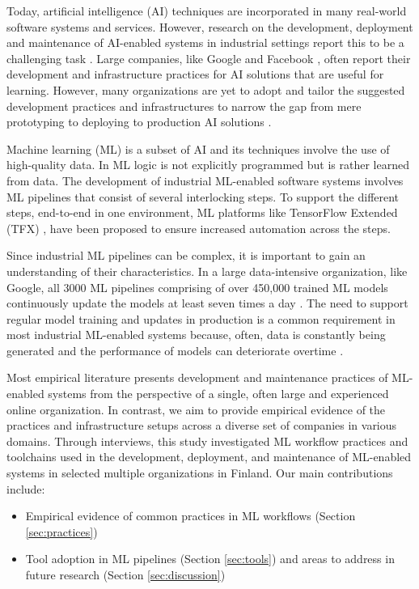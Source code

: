 Today, artificial intelligence (AI) techniques are incorporated in many real-world software systems and services. However, research on the development, deployment and maintenance of AI-enabled systems in industrial settings report this to be a challenging task \cite{Sculley2015, Lwakatare2019}. Large companies, like Google \cite{Baylor2017} and Facebook \cite{Hazelwood2018Facebook}, often report their development and infrastructure practices for AI solutions that are useful for learning. However, many organizations are yet to adopt and tailor the suggested development practices and infrastructures to narrow the gap from mere prototyping to deploying to production AI solutions \cite{Serban2020Practices}. 

Machine learning (ML) is a subset of AI and its techniques involve the use of high-quality data. In ML logic is not explicitly programmed but is rather learned from data. The development of industrial ML-enabled software systems involves ML pipelines that consist of several interlocking steps. To support the different steps, end-to-end in one environment, ML platforms like TensorFlow Extended (TFX) \cite{Baylor2017}, have been proposed to ensure increased automation across the steps.

Since industrial ML pipelines can be complex, it is important to gain an understanding of their characteristics. In a large data-intensive organization, like Google, all 3000 ML pipelines comprising of over 450,000 trained ML models continuously update the models at least seven times a day \cite{Doris2021MLPipelines}. %
The need to support regular model training and updates in production is a common requirement in most industrial ML-enabled systems because, often, data is constantly being generated and the performance of models can deteriorate overtime \cite{Sculley2015}.

Most empirical literature presents development and maintenance practices of ML-enabled systems from the perspective of a single, often large and experienced online organization. In contrast, we aim to provide empirical evidence of the practices and infrastructure setups across a diverse set of companies in various domains. Through interviews, this study investigated ML workflow practices and toolchains used in the development, deployment, and maintenance of ML-enabled systems in selected multiple organizations in Finland. Our main contributions include:
\begin{itemize}
    \item Empirical evidence of common practices in ML workflows (Section \ref{sec:practices})
    \item Tool adoption in ML pipelines (Section \ref{sec:tools}) and areas to address in future research (Section \ref{sec:discussion})
    
\end{itemize}

